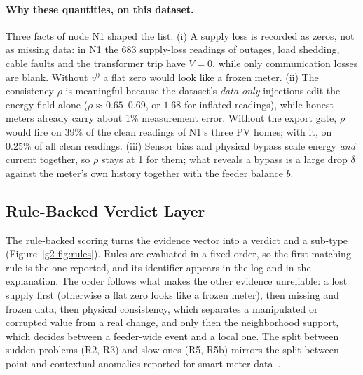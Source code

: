 \paragraph{Why these quantities, on this dataset.} Three facts of node N1 shaped the list.
(i) A supply loss is recorded as zeros, not as missing data: in N1 the 683 supply-loss readings of outages, load
shedding, cable faults and the transformer trip have $V=0$, while only communication losses are blank. Without
$v^{0}$ a flat zero would look like a frozen meter. (ii) The consistency $\rho$ is meaningful because the
dataset's \emph{data-only} injections edit the energy field alone ($\rho\approx0.65$--$0.69$, or $1.68$ for
inflated readings), while honest meters already carry about 1\% measurement error. Without the export gate,
$\rho$ would fire on 39\% of the clean readings of N1's three PV homes; with it, on 0.25\% of all clean
readings. (iii) Sensor bias and physical bypass scale energy \emph{and} current together, so $\rho$ stays at 1
for them; what reveals a bypass is a large drop $\delta$ against the meter's own history together with the
feeder balance $b$.

\subsection{Rule-Backed Verdict Layer}
\label{g2-sec:rules}
The rule-backed scoring turns the evidence vector into a verdict and a sub-type (Figure~\ref{g2-fig:rules}).
Rules are evaluated in a fixed order, so the first matching rule is the one reported, and its identifier
appears in the log and in the explanation. The order follows what makes the other evidence unreliable: a lost
supply first (otherwise a flat zero looks like a frozen meter), then missing and frozen data, then physical
consistency, which separates a manipulated or corrupted value from a real change, and only then the
neighborhood support, which decides between a feeder-wide event and a local one. The split between sudden
problems (R2, R3) and slow ones (R5, R5b) mirrors the split between point and contextual anomalies reported for
smart-meter data~\cite{timefreq}.

